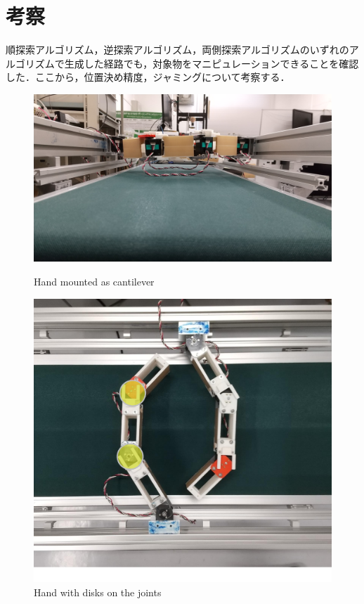 \documentclass[a4paper,twoside,12pt,papersize, dvipdfmx]{iirthesis}
\begin{document}
\section{考察} \label{sec::result::consideration}
順探索アルゴリズム，逆探索アルゴリズム，両側探索アルゴリズムのいずれのアルゴリズムで生成した経路でも，対象物をマニピュレーションできることを確認した．ここから，位置決め精度，ジャミングについて考察する．\par

\begin{figure}[b]
\centering
\begin{minipage}{0.49\hsize}
\includegraphics[width=0.9\hsize]{fig/4-manipulation-result/beam.JPG}
\caption{Hand mounted as cantilever \cite{kamikukita2022}}
\label{fig::manires::cantilever}
\end{minipage}\hfill
\begin{minipage}{0.49\hsize}
\includegraphics[width=0.8\hsize]{fig/4-manipulation-result/disc_mounted.pdf}
\caption{Hand with disks on the joints}
\label{fig::manires::cantilever}
\end{minipage}
\end{figure}
\end{document}
